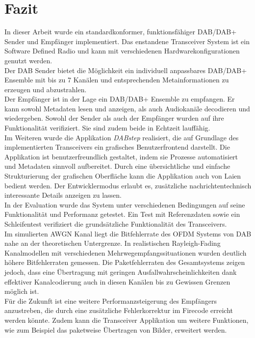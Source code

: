 \chapter{Fazit}\label{chapter:conclusion}
In dieser Arbeit wurde ein standardkonformer, funktionsfähiger DAB/DAB+ Sender und Empfänger implementiert. Das enstandene Transceiver System ist ein Software Defined Radio und kann mit verschiedenen Hardwarekonfigurationen genutzt werden.\\
Der DAB Sender bietet die Möglichkeit ein individuell anpassbares DAB/DAB+ Ensemble mit bis zu 7 Kanälen und entsprechenden Metainformationen zu erzeugen und abzustrahlen.\\
Der Empfänger ist in der Lage ein DAB/DAB+ Ensemble zu empfangen. Er kann sowohl Metadaten lesen und anzeigen, als auch Audiokanäle decodieren und wiedergeben.
Sowohl der Sender als auch der Empfänger wurden auf ihre Funktionalität verifiziert. Sie sind zudem beide in Echtzeit lauffähig.\\
Im Weiteren wurde die Applikation \textit{DABstep} realisiert, die auf Grundlage des implementierten Transceivers ein grafisches Benutzerfrontend darstellt. Die Applikation ist benutzerfreundlich gestaltet, indem sie Prozesse automatisiert und Metadaten sinnvoll aufbereitet. Durch eine übersichtliche und einfache Strukturierung der grafischen Oberfläche kann die Applikation auch von Laien bedient werden. Der Entwicklermodus erlaubt es, zusätzliche nachrichtentechnisch interessante Details anzeigen zu lassen.\\

In der Evaluation wurde das System unter verschiedenen Bedingungen auf seine Funktionalität und Performanz getestet. Ein Test mit Referenzdaten sowie ein Schleifentest verifiziert die grundsätzliche Funktionalität des Transceivers.\\
Im simulierten AWGN Kanal liegt die Bitfehlerrate des OFDM Systems von DAB nahe an der theoretischen Untergrenze. In realistischen Rayleigh-Fading Kanalmodellen mit verschiedenen Mehrwegempfangssituationen wurden deutlich höhere Bitfehlerraten gemessen. Die Paketfehlerraten des Gesamtsystems zeigen jedoch, dass eine Übertragung mit geringen Ausfallwahrscheinlichkeiten dank effektiver Kanalcodierung auch in diesen Kanälen bis zu Gewissen Grenzen möglich ist.\\
Für die Zukunft ist eine weitere Performanzsteigerung des Empfängers anzustreben, die durch eine zusätzliche Fehlerkorrektur im Firecode erreicht werden könnte. Zudem kann die Transceiver Applikation um weitere Funktionen, wie zum Beispiel das paketweise Übertragen von Bilder, erweitert werden.\\

